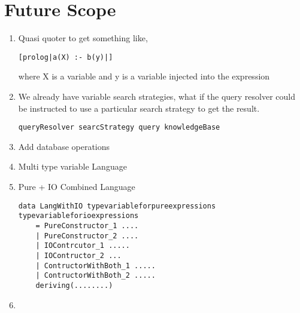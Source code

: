 \documentclass[thesis-solanki.tex]{subfiles}
\begin{document}
\chapter{Future Scope}\label{chap:futureScope}

\begin{enumerate}

\item Quasi quoter to get something like,
\begin{verbatim}
[prolog|a(X) :- b(y)|]
\end{verbatim}
where X is a   variable and y is a  variable injected into the expression


\item We already have variable search strategies, what if the query resolver could be instructed to use a particular search strategy to get 
the result.
\begin{verbatim}
queryResolver searcStrategy query knowledgeBase
\end{verbatim}


\item Add database operations

\item Multi type variable Language

\item Pure + IO Combined Language

\begin{verbatim}
data LangWithIO typevariableforpureexpressions typevariableforioexpressions
	= PureConstructor_1 ....
	| PureConstructor_2 ....
	| IOContrcutor_1 .....
	| IOContructor_2 ...
	| ContructorWithBoth_1 .....
	| ContructorWithBoth_2 .....
	deriving(........)
\end{verbatim}

\item 

\end{enumerate}
\end{document}
